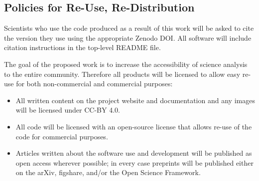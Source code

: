 \documentclass[11pt,oneside]{memoir}
\begin{document}



\subsection{Policies for Re-Use, Re-Distribution}
Scientists who use the code produced as a result of this work will be asked to cite the version they use using the appropriate Zenodo DOI.  All software will include citation instructions in the top-level README file.

The goal of the proposed work is to increase the accessibility of science analysis to the entire community.  Therefore all products will be licensed to allow easy re-use for both non-commercial and commercial purposes:

\begin{itemize}
  \item All written content on the project website and documentation and any images will be licensed under CC-BY 4.0. 
  \item All code will be licensed with an open-source license that allows re-use of the code for commercial purposes.  
  \item Articles written about the software use and development will be published as open access wherever possible; in every case preprints will be published either on the arXiv, figshare, and/or the Open Science Framework.
\end{itemize}
\end{document}
